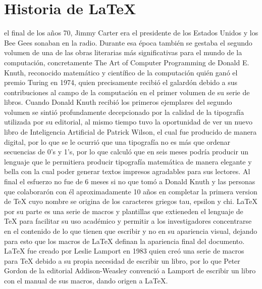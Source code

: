 \documentclass[journal]{IEEEtran}
\begin{document}
\section{Historia de \LaTeX\xspace }
% 
% 
% 
% 
 el final de los años 70, Jimmy Carter era el presidente de los Estados Unidos y los Bee Gees sonaban en la radio. Durante esa época también se gestaba el segundo volumen de  una de las obras literarias más significativas para el mundo de la computación, concretamente The Art of Computer Programming de Donald E. Knuth, reconocido matemático y científico de la computación quién ganó el premio Turing en 1974, quien precisamente recibió el galardón debido a sus contribuciones al campo de la computación en el primer volumen de su serie de libros.
Cuando Donald Knuth recibió los primeros ejemplares del segundo volumen se sintió profundamente decepcionado por la calidad de la tipografía utilizada por su editorial, al mismo tiempo tuvo la oportunidad de ver un nuevo libro de Inteligencia Artificial de Patrick Wilson, el cual fue producido de manera digital, por lo que se le ocurrió que una tipografía no es más que ordenar secuencias de 0’s y 1’s, por lo que calculó que en seis meses podría producir un lenguaje que le permitiera producir tipografía matemática de manera elegante y bella con la cual poder generar textos impresos agradables para sus lectores.
Al final el esfuerzo no fue de 6 meses si no que tomó a Donald Knuth y las personas que colaborarón con él aproximadamente 10 años en completar la primera version de TeX cuyo nombre se origina de los caracteres griegos tau, epsilon y chi\cite{ganguli_2013}.
LaTeX por su parte es una serie de macros y plantillas que extieneden el lenguaje de TeX para facilitar su uso académico y permitir a los investigadores concentrarse en el contenido de lo que tienen que escribir y no en su apariencia visual, dejando para esto que los macros de LaTeX definan la apariencia final del documento. LaTeX fue creado por Leslie Lamport en 1983 quien creó una serie de macros para TeX debido a su propia necesidad de escribir un libro, por lo que Peter Gordon de la editorial Addison-Weasley convenció a Lamport de escribir un libro con el manual de sus macros, dando origen a \LaTeX\xspace . \cite{lamport_1994}
\end{document}
